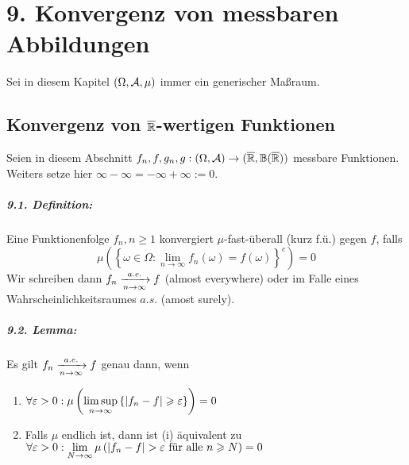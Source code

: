 \chapter*{9. Konvergenz von messbaren Abbildungen}
Sei in diesem Kapitel $(\Omega,\mathcal{A},\mu)$ immer ein generischer Ma\ss{}raum.
\section*{Konvergenz von $\overline{\mathbb{R}}$-wertigen Funktionen}
Seien in diesem Abschnitt $f_n,f,g_n,g:(\Omega,\mathcal{A})\to(\overline{\mathbb{R}},\mathbb{B}(\overline{\mathbb{R}}))$ messbare Funktionen. Weiters setze hier $\infty-\infty=-\infty+\infty:=0$.

\paragraph{9.1. Definition:} Eine Funktionenfolge $f_n,n\geq1$ konvergiert $\mu$-fast-\"uberall (kurz f.\"u.) gegen $f$, falls
$$\mu\left(\left\{\omega\in\Omega:\lim_{n\to\infty}f_n(\omega)=f(\omega)\right\}^c\right)=0$$
Wir schreiben dann $f_n\nto{a.e.}{n\to\infty}f$ (almost everywhere) oder im Falle eines Wahrscheinlichkeitsraumes $a.s.$ (amost surely).

\paragraph{9.2. Lemma:} Es gilt $f_n\nto{a.e.}{n\to\infty}f$ genau dann, wenn
\begin{enumerate}[label=(\roman*)]
    \item $\forall\varepsilon>0:\mu\left(\displaystyle\limsup_{n\to\infty}\left\{|f_n-f|\geqslant\varepsilon\right\}\right)=0$
    \item Falls $\mu$ endlich ist, dann ist (i) \"aquivalent zu $\forall\eps>0:\displaystyle\lim_{N\to\infty}\mu\left(|f_n-f|>\eps\text{ f\"ur alle }n\geq N\right)=0$
\end{enumerate}

